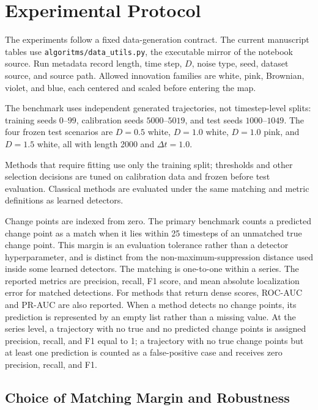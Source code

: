 ﻿\section{Experimental Protocol}

The experiments follow a fixed data-generation contract. The current manuscript
tables use \texttt{algoritms/data\_utils.py}, the executable mirror of the
notebook source. Run metadata record length, time step, \(D\), noise type,
seed, dataset source, and source path. Allowed innovation families are white,
pink, Brownian, violet, and blue, each centered and scaled before entering the
map.

The benchmark uses independent generated trajectories, not timestep-level
splits: training seeds \(0\)--\(99\), calibration seeds \(5000\)--\(5019\), and
test seeds \(1000\)--\(1049\). The four frozen test scenarios are \(D=0.5\)
white, \(D=1.0\) white, \(D=1.0\) pink, and \(D=1.5\) white, all with length
2000 and \(\Delta t=1.0\).

Methods that require fitting use only the training split; thresholds and other
selection decisions are tuned on calibration data and frozen before test
evaluation. Classical methods are evaluated under the same matching and metric
definitions as learned detectors.

Change points are indexed from zero. The primary benchmark counts a predicted
change point as a match when it lies within 25 timesteps of an unmatched true
change point. This margin is an evaluation tolerance rather than a detector
hyperparameter, and is distinct from the non-maximum-suppression distance used
inside some learned detectors. The matching is one-to-one within a series. The
reported metrics are precision, recall, F1 score, and mean absolute
localization error for matched detections. For methods that return dense
scores, ROC-AUC and PR-AUC are also reported. When a method detects no change
points, its prediction is represented by an empty list rather than a missing
value. At the series level, a trajectory with no true and no predicted change
points is assigned precision, recall, and F1 equal to 1; a trajectory with no
true change points but at least one prediction is counted as a false-positive
case and receives zero precision, recall, and F1.

\subsection{Choice of Matching Margin and Robustness}

